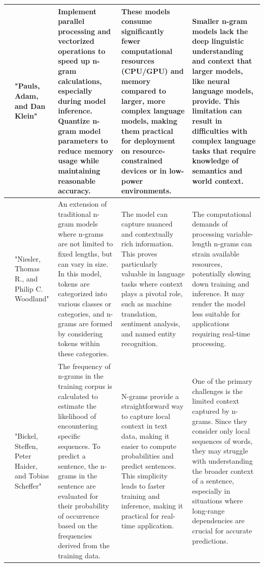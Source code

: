 \documentclass[conference]{IEEEtran}
\begin{document}
\begin{table}
\begin{center}
\begin{tabular}{ |p{1cm}|p{2cm}|p{4cm}|p{4cm}|p{4cm}| }
\hline
[10] &  "Pauls, Adam, and Dan Klein" &  Implement parallel processing and vectorized operations to speed up n-gram calculations, especially during model inference. Quantize n-gram model parameters to reduce memory usage while maintaining reasonable accuracy. &  These models consume significantly fewer computational resources (CPU/GPU) and memory compared to larger, more complex language models, making them practical for deployment on resource-constrained devices or in low-power environments. &  Smaller n-gram models lack the deep linguistic understanding and context that larger models, like neural language models, provide. This limitation can result in difficulties with complex language tasks that require knowledge of semantics and world context.  \\
\hline
[11] &  "Niesler, Thomas R., and Philip C. Woodland" & An extension of traditional n-gram models where n-grams are not limited to fixed lengths, but can vary in size. In this model, tokens are categorized into various classes or categories, and n-grams are formed by considering tokens within these categories. &  The model can capture nuanced and contextually rich information. This proves particularly valuable in language tasks where context plays a pivotal role, such as machine translation, sentiment analysis, and named entity recognition. & The computational demands of processing variable-length n-grams can strain available resources, potentially slowing down training and inference. It may render the model less suitable for applications requiring real-time processing. \\
\hline
[12]  &  "Bickel, Steffen, Peter Haider, and Tobias Scheffer" &  The frequency of n-grams in the training corpus is calculated to estimate the likelihood of encountering specific sequences. To predict a sentence, the n-grams in the sentence are evaluated for their probability of occurrence based on the frequencies derived from the training data. &  N-grams provide a straightforward way to capture local context in text data, making it easier to compute probabilities and predict sentences. This simplicity leads to faster training and inference, making it practical for real-time application. &  One of the primary challenges is the limited context captured by n-grams. Since they consider only local sequences of words, they may struggle with understanding the broader context of a sentence, especially in situations where long-range dependencies are crucial for accurate predictions.  \\
\hline

\end{tabular}
\end{center}
\end{table}
\end{document}
